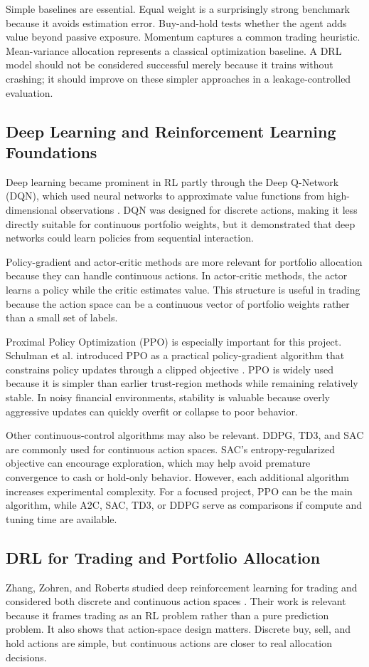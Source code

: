 \documentclass[11pt]{article}
\begin{document}
Simple baselines are essential. Equal weight is a surprisingly strong benchmark because it avoids estimation error. Buy-and-hold tests whether the agent adds value beyond passive exposure. Momentum captures a common trading heuristic. Mean-variance allocation represents a classical optimization baseline. A DRL model should not be considered successful merely because it trains without crashing; it should improve on these simpler approaches in a leakage-controlled evaluation.

\subsection{Deep Learning and Reinforcement Learning Foundations}
Deep learning became prominent in RL partly through the Deep Q-Network (DQN), which used neural networks to approximate value functions from high-dimensional observations \cite{dqn}. DQN was designed for discrete actions, making it less directly suitable for continuous portfolio weights, but it demonstrated that deep networks could learn policies from sequential interaction.

Policy-gradient and actor-critic methods are more relevant for portfolio allocation because they can handle continuous actions. In actor-critic methods, the actor learns a policy while the critic estimates value. This structure is useful in trading because the action space can be a continuous vector of portfolio weights rather than a small set of labels.

Proximal Policy Optimization (PPO) is especially important for this project. Schulman et al. introduced PPO as a practical policy-gradient algorithm that constrains policy updates through a clipped objective \cite{ppo}. PPO is widely used because it is simpler than earlier trust-region methods while remaining relatively stable. In noisy financial environments, stability is valuable because overly aggressive updates can quickly overfit or collapse to poor behavior.

Other continuous-control algorithms may also be relevant. DDPG, TD3, and SAC are commonly used for continuous action spaces. SAC's entropy-regularized objective can encourage exploration, which may help avoid premature convergence to cash or hold-only behavior. However, each additional algorithm increases experimental complexity. For a focused project, PPO can be the main algorithm, while A2C, SAC, TD3, or DDPG serve as comparisons if compute and tuning time are available.

\subsection{DRL for Trading and Portfolio Allocation}
Zhang, Zohren, and Roberts studied deep reinforcement learning for trading and considered both discrete and continuous action spaces \cite{zhangtrading}. Their work is relevant because it frames trading as an RL problem rather than a pure prediction problem. It also shows that action-space design matters. Discrete buy, sell, and hold actions are simple, but continuous actions are closer to real allocation decisions.
\end{document}
